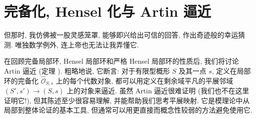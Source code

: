 \begingroup
\raggedbottom
\setlength{\emergencystretch}{2em}
\section{完备化, Hensel 化与 Artin 逼近}\label{src:B.5}
\begin{epigraph}
但那时, 我仿佛被一股灵感笼罩, 能够即兴给出可信的回答, 作出奇迹般的幸运猜测. 唯独数学例外, 连上帝也无法让我弄懂它.
\end{epigraph}
在回顾完备局部环, Hensel 局部环和严格 Hensel 局部环的性质后, 我们将讨论 Artin 逼近 (定理 ). 粗略地说, 它断言: 对于有限型概形 $S$ 及其一点 $s$, 定义在局部环的完备化 $\widehat{\mathcal O}_{S,s}$ 上的每个代数对象, 都可以用定义在剩余域平凡的平展邻域 $(S',s')\to(S,s)$ 上的对象来逼近. 虽然 Artin 逼近很难证明 (我们也不在这里证明它!), 但其陈述至少很容易理解, 并能帮助我们思考平展映射. 它是模理论中从局部到整体论证的基本工具, 但通常可以用更直接而概念性较弱的方法避免使用它.

